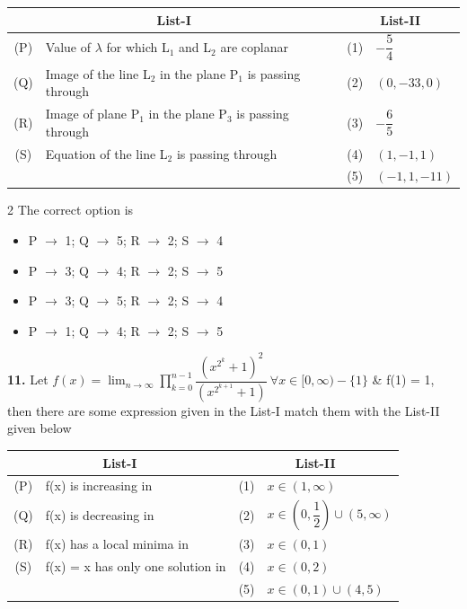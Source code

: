\documentclass[10pt]{extarticle}
\newenvironment{qoptions}{\begin{itemize}[leftmargin=1.8em,itemsep=2pt,topsep=2pt,label={}]}{\end{itemize}}
\newcommand{\opt}[2]{\item[({#1})] {#2}}
\begin{document}
\begin{center}
\begin{tabular}{|c|l|c|l|}
\hline
\multicolumn{2}{|c|}{\textbf{List-I}} & \multicolumn{2}{c|}{\textbf{List-II}} \\
\hline
(P) & Value of $\lambda$ for which L$_1$ and L$_2$ are coplanar & (1) & $-\dfrac54$ \\[8pt]
\hline
(Q) & Image of the line L$_2$ in the plane P$_1$ is passing through & (2) & $(0,-33,0)$ \\
\hline
(R) & Image of plane P$_1$ in the plane P$_3$ is passing through & (3) & $-\dfrac65$ \\[8pt]
\hline
(S) & Equation of the line L$_2$ is passing through & (4) & $(1,-1,1)$ \\
\hline
 & & (5) & $(-1,1,-11)$ \\
\hline
\end{tabular}
\end{center}

\begin{multicols}{2}
The correct option is

\begin{qoptions}
\opt{A}{P $\to$ 1; Q $\to$ 5; R $\to$ 2; S $\to$ 4}
\opt{B}{P $\to$ 3; Q $\to$ 4; R $\to$ 2; S $\to$ 5}
\opt{C}{P $\to$ 3; Q $\to$ 5; R $\to$ 2; S $\to$ 4}
\opt{D}{P $\to$ 1; Q $\to$ 4; R $\to$ 2; S $\to$ 5}
\end{qoptions}

\textbf{11.} Let $f(x)=\displaystyle\lim_{n\to\infty}\prod_{k=0}^{n-1}\dfrac{\left(x^{2^k}+1\right)^2}{\left(x^{2^{k+1}}+1\right)}\ \forall x\in[0,\infty)-\{1\}$ \& f(1) = 1, then there are some expression given in the List-I match them with the List-II given below

\end{multicols}

\begin{center}
\begin{tabular}{|c|l|c|l|}
\hline
\multicolumn{2}{|c|}{\textbf{List-I}} & \multicolumn{2}{c|}{\textbf{List-II}} \\
\hline
(P) & f(x) is increasing in & (1) & $x\in(1,\infty)$ \\
\hline
(Q) & f(x) is decreasing in & (2) & $x\in\left(0,\dfrac12\right)\cup(5,\infty)$ \\[8pt]
\hline
(R) & f(x) has a local minima in & (3) & $x\in(0,1)$ \\
\hline
(S) & f(x) = x has only one solution in & (4) & $x\in(0,2)$ \\
\hline
 & & (5) & $x\in(0,1)\cup(4,5)$ \\
\hline
\end{tabular}
\end{center}
\end{document}
